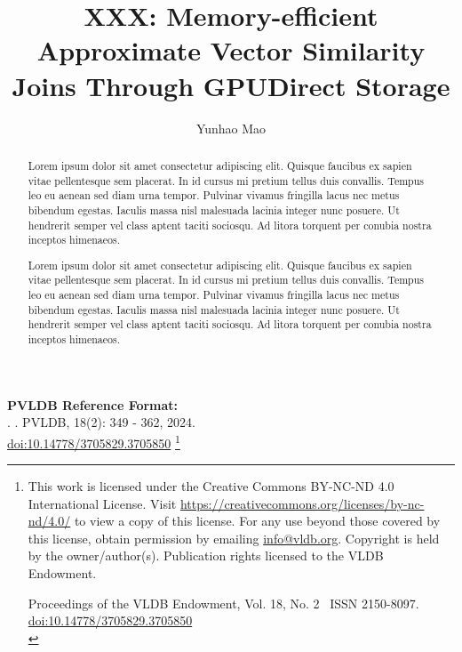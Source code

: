 \documentclass[sigconf, nonacm, pdfa]{acmart}
\newcommand\vldbdoi{10.14778/3705829.3705850}
\newcommand\vldbpages{349 - 362}
\newcommand\vldbvolume{18}
\newcommand\vldbissue{2}
\newcommand\vldbyear{2024}
\newcommand\vldbauthors{\authors}
\newcommand\vldbtitle{\shorttitle}
\newcommand\vldbpagestyle{empty}
\begin{document}
\title{XXX: Memory-efficient Approximate Vector Similarity Joins Through GPUDirect Storage}

\author{Yunhao Mao}


\begin{abstract}    
Lorem ipsum dolor sit amet consectetur adipiscing elit. Quisque faucibus ex sapien vitae pellentesque sem placerat. In id cursus mi pretium tellus duis convallis. Tempus leo eu aenean sed diam urna tempor. Pulvinar vivamus fringilla lacus nec metus bibendum egestas. Iaculis massa nisl malesuada lacinia integer nunc posuere. Ut hendrerit semper vel class aptent taciti sociosqu. Ad litora torquent per conubia nostra inceptos himenaeos.

Lorem ipsum dolor sit amet consectetur adipiscing elit. Quisque faucibus ex sapien vitae pellentesque sem placerat. In id cursus mi pretium tellus duis convallis. Tempus leo eu aenean sed diam urna tempor. Pulvinar vivamus fringilla lacus nec metus bibendum egestas. Iaculis massa nisl malesuada lacinia integer nunc posuere. Ut hendrerit semper vel class aptent taciti sociosqu. Ad litora torquent per conubia nostra inceptos himenaeos.
\end{abstract}

\maketitle

\pagestyle{\vldbpagestyle}
\begingroup\small\noindent\raggedright\textbf{PVLDB Reference Format:}\\
\vldbauthors. \vldbtitle. PVLDB, \vldbvolume(\vldbissue): \vldbpages, \vldbyear.\\
\href{https://doi.org/\vldbdoi}{doi:\vldbdoi}
\endgroup
\begingroup
\renewcommand\thefootnote{}\footnote{\noindent
This work is licensed under the Creative Commons BY-NC-ND 4.0 International License. Visit \url{https://creativecommons.org/licenses/by-nc-nd/4.0/} to view a copy of this license. For any use beyond those covered by this license, obtain permission by emailing \href{mailto:info@vldb.org}{info@vldb.org}. Copyright is held by the owner/author(s). Publication rights licensed to the VLDB Endowment. \\
\raggedright Proceedings of the VLDB Endowment, Vol. \vldbvolume, No. \vldbissue\ %
ISSN 2150-8097. \\
\href{https://doi.org/\vldbdoi}{doi:\vldbdoi} \\
}\addtocounter{footnote}{-1}\endgroup
\end{document}
